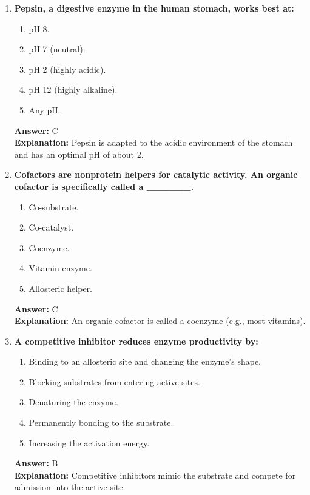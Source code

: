 \documentclass[11pt, a4paper]{article}
\begin{document}
\begin{enumerate}[leftmargin=*, label=\arabic*.]
\item \textbf{Pepsin, a digestive enzyme in the human stomach, works best at:}
\begin{enumerate}[label=\Alph*.]
    \item pH 8.
    \item pH 7 (neutral).
    \item pH 2 (highly acidic).
    \item pH 12 (highly alkaline).
    \item Any pH.
\end{enumerate}
\textbf{Answer:} C \\
\textbf{Explanation:} Pepsin is adapted to the acidic environment of the stomach and has an optimal pH of about 2.

\item \textbf{Cofactors are nonprotein helpers for catalytic activity. An organic cofactor is specifically called a \_\_\_\_\_\_.}
\begin{enumerate}[label=\Alph*.]
    \item Co-substrate.
    \item Co-catalyst.
    \item Coenzyme.
    \item Vitamin-enzyme.
    \item Allosteric helper.
\end{enumerate}
\textbf{Answer:} C \\
\textbf{Explanation:} An organic cofactor is called a coenzyme (e.g., most vitamins).

\item \textbf{A competitive inhibitor reduces enzyme productivity by:}
\begin{enumerate}[label=\Alph*.]
    \item Binding to an allosteric site and changing the enzyme's shape.
    \item Blocking substrates from entering active sites.
    \item Denaturing the enzyme.
    \item Permanently bonding to the substrate.
    \item Increasing the activation energy.
\end{enumerate}
\textbf{Answer:} B \\
\textbf{Explanation:} Competitive inhibitors mimic the substrate and compete for admission into the active site.


\end{enumerate}
\end{document}
